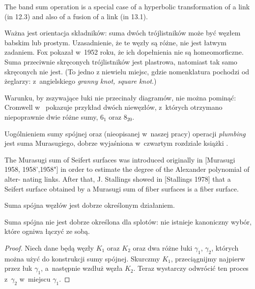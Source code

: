 \begin{tobedone}
The band sum operation is a special case of a hyperbolic transformation of a link (in 12.3) and also of a fusion of a link (in 13.1).
\end{tobedone}

Ważna jest orientacja składników: suma dwóch trójlistników może być węzłem babskim lub prostym.
Uzasadnienie, że te węzły są różne, nie jest łatwym zadaniem.
Fox pokazał w~1952 roku, że ich dopełnienia nie są homeomorficzne.
Suma przeciwnie skręconych trójlistników jest plastrowa, natomiast tak samo skręconych nie jest.
(To jedno z niewielu miejsc, gdzie nomenklatura pochodzi od żeglarzy: z~angielskiego \emph{granny knot, square knot}.)

Warunku, by zszywające łuki nie przecinały diagramów, nie można pominąć: Cromwell w~\cite[s.90]{cromwell04} pokazuje przykład dwóch niewęzłów, z~których otrzymano niepoprawnie dwie różne sumy, $6_1$ oraz $8_{20}$.

Uogólnieniem sumy spójnej oraz (nieopisanej w~naszej pracy) operacji \emph{plumbing} jest suma Murasugiego, dobrze wyjaśniona w~czwartym rozdziale książki \cite{kawauchi96}.

\begin{tobedone}
The Murasugi sum of Seifert surfaces was introduced originally in [Murasugi 1958, 1958',1958"] in order to estimate the degree of the Alexander polynomial of alter- nating links. After that, J. Stallings showed in [Stallings 1978] that a Seifert surface obtained by a Murasugi sum of fiber surfaces is a fiber surface.
\end{tobedone}


\begin{proposition}
    Suma spójna węzłów jest dobrze określonym działaniem.
\end{proposition}

Suma spójna nie jest dobrze określona dla splotów:
nie istnieje kanoniczny wybór, które ogniwa łączyć ze sobą.

\begin{proof}
    Niech dane będą węzły $K_1$ oraz $K_2$
    oraz dwa różne łuki $\gamma_1$, $\gamma_2$,
    których można użyć do konstrukcji sumy spójnej.
    Skurczmy $K_1$, przeciągnijmy najpierw przez łuk $\gamma_1$, a~następnie wzdłuż węzła $K_2$.
    Teraz wystarczy odwrócić ten proces z~$\gamma_2$ w~miejscu $\gamma_1$.
\end{proof}


